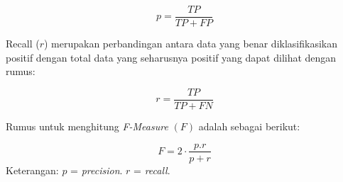 \begin{equation}
p= \frac{TP} {TP+FP}
\end{equation}

\par Recall ($r$) merupakan perbandingan antara data yang benar diklasifikasikan positif dengan total data yang seharusnya positif yang dapat dilihat dengan rumus:

\begin{equation}
r= \frac{TP} {TP+FN} 
\end{equation}
\newline
\par Rumus untuk menghitung \textit{F-Measure} $(F)$ adalah sebagai berikut:

\begin{equation}
F=2 \cdot \frac{p.r} {p+r}
\end{equation}
\newline
Keterangan:\newline
$p$ = \textit{precision}. \newline
$r$ = \textit{recall}. 

